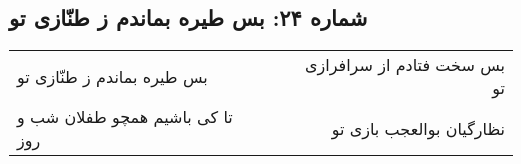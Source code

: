 \begin{center}
\section*{شماره ۲۴: بس طیره بماندم ز طنّازی تو}
\label{sec:024}
\begin{longtable}{l p{0.5cm} r}
بس طیره بماندم ز طنّازی تو
&&
بس سخت فتادم از سرافرازی تو
\\
تا کی باشیم همچو طفلان شب و روز
&&
نظارگیان بوالعجب بازی تو
\\
\end{longtable}
\end{center}
